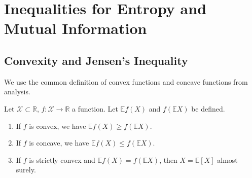 \section{Inequalities for Entropy and Mutual Information}
\subsection{Convexity and Jensen's Inequality}

\begin{remark}
    We use the common definition of convex functions and concave functions from analysis.
\end{remark}

\begin{theorem}
    Let $\mathcal{X} \subset \mathbb{R}$, $f: \mathcal{X} \rightarrow \mathbb{R}$ a function. Let $\mathbb{E} f(X)$ and $f(\mathbb{E} X)$ be defined.
    \begin{enumerate}
        \item If $f$ is convex, we have $\mathbb{E} f(X) \ge f(\mathbb{E} X)$.
        \item If $f$ is concave, we have $\mathbb{E} f(X) \le f(\mathbb{E} X)$.
        \item If $f$ is strictly convex and $\mathbb{E} f(X) = f(\mathbb{E} X)$, then $X = \mathbb{E}[X]$ almost surely.
    \end{enumerate}
\end{theorem}
